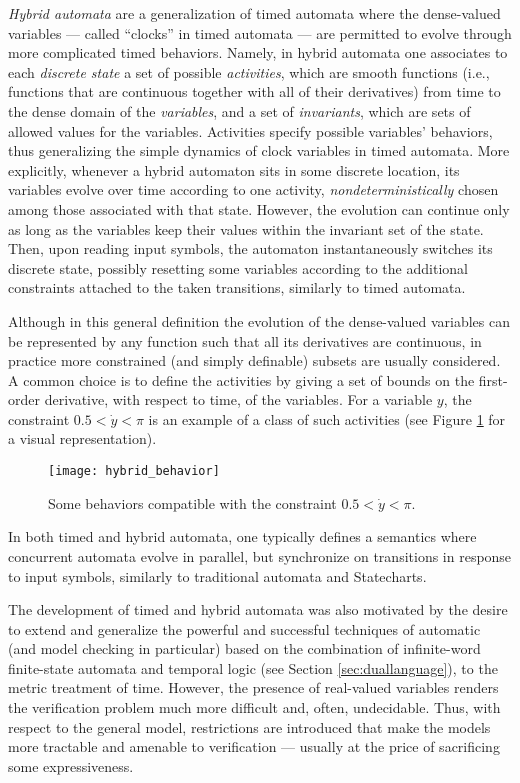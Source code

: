 \emph{Hybrid automata} \cite{ACHH93,NOSY93,Hen96} are a generalization 
of timed automata where the dense-valued variables --- called 
``clocks'' in timed automata --- are permitted to evolve through 
more complicated timed behaviors. Namely, in hybrid automata 
one associates to each \emph{discrete state} a set of possible \emph{activities}, 
which are smooth functions (i.e., functions that are continuous 
together with all of their derivatives) from time to the dense 
domain of the \emph{variables}, and a set of \emph{invariants}, which 
are sets of allowed values for the variables. Activities specify 
possible variables' behaviors, thus generalizing the simple dynamics 
of clock variables in timed automata. More explicitly, whenever 
a hybrid automaton sits in some discrete location, its variables 
evolve over time according to one activity, \emph{nondeterministically} 
chosen among those associated with that state. However, the evolution 
can continue only as long as the variables keep their values 
within the invariant set of the state. Then, upon reading input 
symbols, the automaton instantaneously switches its discrete 
state, possibly resetting some variables according to the additional 
constraints attached to the taken transitions, similarly to timed 
automata.

Although in this general definition the evolution of the dense-valued 
variables can be represented by any function such that all its derivatives are continuous, in practice 
more constrained (and simply definable) subsets are usually considered. 
A common choice is to define the activities by giving a set of 
bounds on the first-order derivative, with respect to time, of 
the variables. For a variable $y$, the constraint $0.5 < \dot{y} < \pi$
is an example of a class of such activities (see Figure \ref{fig:hybrid_behavior} for a visual
representation).
\begin{figure}[htb!]
	 \centering
	 \texttt{[image: hybrid\_behavior]}
	 \caption{Some behaviors compatible with the constraint $0.5 < \dot{y} < \pi$.}
	 \label{fig:hybrid_behavior}
\end{figure}

In both timed and hybrid automata, one typically defines a 
semantics where concurrent automata evolve in parallel, but synchronize 
on transitions in response to input symbols, similarly to traditional 
automata and Statecharts.

The development of timed and hybrid automata was also motivated 
by the desire to extend and generalize the powerful and
successful techniques of automatic  (and model checking 
in particular) based on the combination of infinite-word finite-state 
automata and temporal logic (see Section \ref{sec:duallanguage}), to the metric 
treatment of time. However, the presence of real-valued variables 
renders the verification problem much more difficult and, often, 
undecidable. Thus, with respect to the general model, restrictions 
are introduced that make the models more tractable and amenable 
to verification --- usually at the price of sacrificing some expressiveness.

